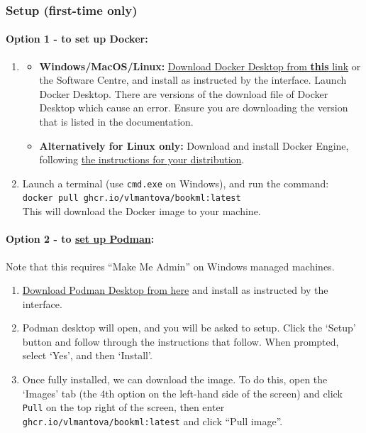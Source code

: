 \subsubsection{Setup (first-time only)}
\label{sssec:setup}

\paragraph{Option 1 - to set up Docker:}

\begin{enumerate}
    \item
        \begin{itemize}
            \item \textbf{Windows/MacOS/Linux:} \href{https://docs.docker.com/desktop/install/windows-install/}{Download Docker Desktop from \textbf{this} link} or the Software Centre, and install as instructed by the interface. Launch Docker Desktop. 
There are versions of the download file of Docker Desktop which cause an error. Ensure you are downloading the version that is listed in the documentation.
            \item \textbf{Alternatively for Linux only:} Download and install Docker Engine, following \href{https://docs.docker.com/engine/install/}{the instructions for your distribution}.
        \end{itemize}
    \item Launch a terminal (use \verb|cmd.exe| on Windows), and run the command:\\
        \verb|docker pull ghcr.io/vlmantova/bookml:latest|\\
        This will download the Docker image to your machine.
\end{enumerate}

\paragraph{Option 2 - to \href{https://podman.io/docs/installation}{set up Podman}:}

Note that this requires ``Make Me Admin'' on Windows managed machines.

\begin{enumerate}
    \item \href{https://podman.io/}{Download Podman Desktop from here} and install as instructed by the interface. 
    \item Podman desktop will open, and you will be asked to setup.
    Click the `Setup' button and follow through the instructions 
    that follow. When prompted, select `Yes', and then `Install'. 
    \item Once fully installed, we can download the image. To do this, open the `Images' tab
        (the 4th option on the left-hand side of the screen) and click \verb|Pull| on the top right of the screen, then enter \verb|ghcr.io/vlmantova/bookml:latest| and click ``Pull image''. 
\end{enumerate}

